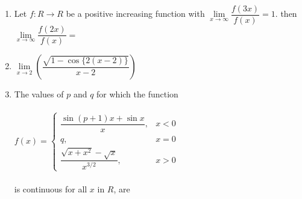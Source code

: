\documentclass[journal,12pt,twocolumn]{IEEEtran}
\begin{document}
\begin{enumerate}
\item Let $f:R \to R$ be a positive increasing function with $\lim\limits_{x \to \infty}\dfrac{f(3x)}{f(x)}=1$. then $\lim\limits_{x \to \infty}\dfrac{f(2x)}{f(x)}=$
\begin{itemize}
\end{itemize}

\item $\lim\limits_{x \to2}\left(\dfrac{\sqrt{1-\cos\{2(x-2)\}}}{x-2}\right)$
\begin{itemize}
\end{itemize}

\item The values of $p$ and $q$ for which the function\\
\\
$f(x)=\begin{cases}
\dfrac{\sin(p+1)x+\sin x}{x}, &\text{$x<0$}\\
q, &\text{$x=0$}\\
\dfrac{\sqrt{x+x^2}-\sqrt{x}}{x^{3/2}}, & \text{$x>0$}
\end{cases}$ \\
\\is continuous for all $x$ in $R$, are
\begin{itemize}
\end{itemize}


\end{enumerate}
\end{document}
